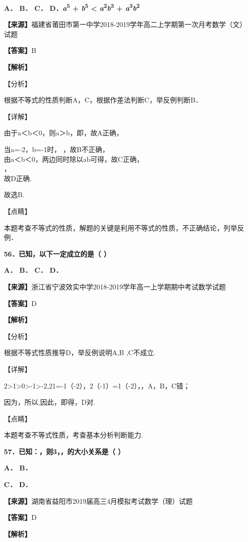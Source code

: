 \textbf{A． B． C． D．\emph{a}\textsuperscript{5} +
\emph{b}\textsuperscript{5} \textless{}
\emph{a}\textsuperscript{2}\emph{b}\textsuperscript{3} +
\emph{a}\textsuperscript{3}\emph{b}\textsuperscript{2}}

\textbf{【来源】}福建省莆田市第一中学2018-2019学年高二上学期第一次月考数学（文）试题

\textbf{【答案】}B

\textbf{【解析】}

【分析】

根据不等式的性质判断A，C，根据作差法判断C，举反例判断B．

【详解】

由于a＜b＜0，则\textbar a\textbar＞\textbar b\textbar，即，故A正确，

当a=-2，b=-1时， ，故B不正确，\\
由a＜b＜0，两边同时除以ab可得，故C正确，\\
，\\
故D正确.

故选B.

【点睛】

本题考查不等式的性质，解题的关键是利用不等式的性质，不正确结论，列举反例．

\textbf{56．已知，以下一定成立的是（ ）}

\textbf{A． B． C． D．}

\textbf{【来源】}浙江省宁波效实中学2018-2019学年高一上学期期中考试数学试题

\textbf{【答案】}D

\textbf{【解析】}

【分析】

根据不等式性质推导D，举反例说明A,B ,C不成立.

【详解】

2\textgreater1\textgreater0\textgreater-1\textgreater-2,21=-1（-2），2（-1）=1（-2），，A，B，C错；

因为，所以,因此，即得，D对.

【点睛】

本题考查不等式性质，考查基本分析判断能力.

\textbf{57．已知：，则3，，的大小关系是（ ）}

\textbf{A． B．}

\textbf{C． D．}

\textbf{【来源】}湖南省益阳市2019届高三4月模拟考试数学（理）试题

\textbf{【答案】}D

\textbf{【解析】}

